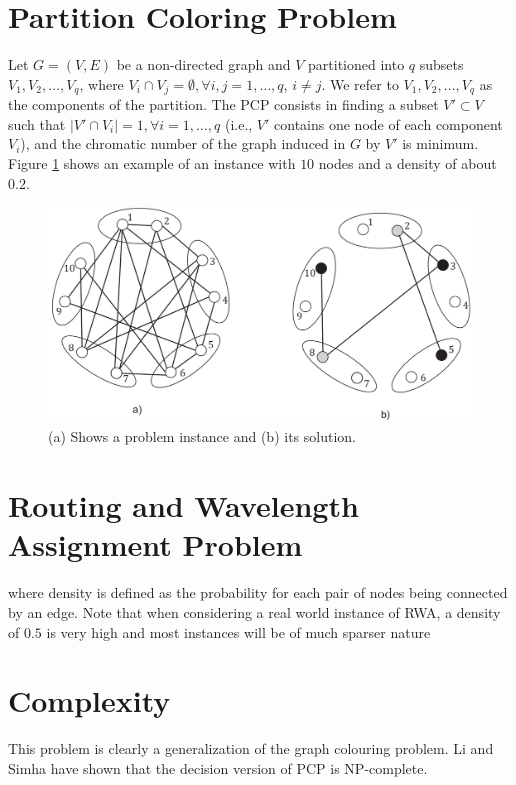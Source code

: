 \section{Partition Coloring Problem}

Let $G = (V, E)$ be a non-directed graph and $V$ partitioned into $q$ subsets $V_1, V_2,\ldots, V_q$, where $V_i \cap V_j = \emptyset, \forall i, j = 1, \ldots , q$, $i \neq j$. We refer to $V_1, V_2, \ldots , V_q$ as the components of the partition. The PCP consists in finding a subset $V' \subset V$ such that $|V' \cap V_i| = 1, \forall i = 1, \ldots , q$ (i.e., $V'$ contains one node of each component $V_i$), and the chromatic number of the graph induced in $G$ by $V'$ is minimum.\\
Figure \ref{pd:pcpExample} shows an example of an instance with $10$ nodes and a density of about $0.2$.


\begin{figure}
\begin{center}
\includegraphics[scale=0.3]{figures/pcp.png}
\caption{(a) Shows a problem instance and (b) its solution.}
\label{pd:pcpExample}
\end{center}
\end{figure}



\section{Routing and Wavelength Assignment Problem}



where density is defined as the probability for each pair of nodes being connected by an edge. Note that when considering a real world instance of RWA, a density of $0.5$ is very high and most instances will be of much sparser nature

\section{Complexity}
This problem is clearly a generalization of the graph colouring problem. Li and Simha \cite{li-00}	
have shown that the decision version of PCP is
NP-complete.


